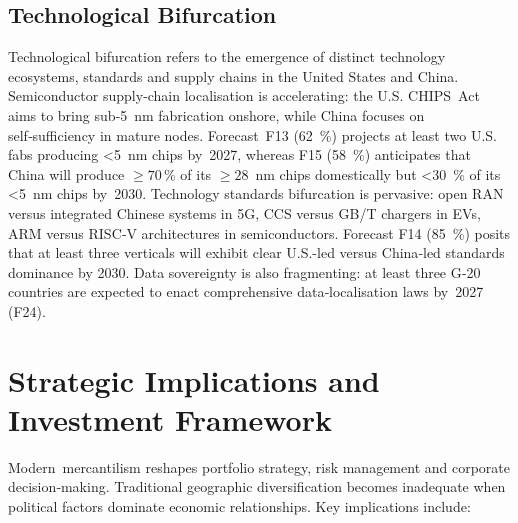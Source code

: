 \documentclass[12pt]{article}
\begin{document}
\subsection{Technological Bifurcation}

Technological bifurcation refers to the emergence of distinct technology ecosystems, standards and supply chains in the United States and China.  Semiconductor supply‑chain localisation is accelerating: the U.S. CHIPS Act aims to bring sub‑5 nm fabrication onshore, while China focuses on self‑sufficiency in mature nodes.  Forecast F13 (62 \%) projects at least two U.S. fabs producing <5 nm chips by 2027, whereas F15 (58 \%) anticipates that China will produce \(\geq 70\,\%\) of its \(\geq 28\) nm chips domestically but <30 \% of its <5 nm chips by 2030.  Technology standards bifurcation is pervasive: open RAN versus integrated Chinese systems in 5G, CCS versus GB/T chargers in EVs, ARM versus RISC‑V architectures in semiconductors.  Forecast F14 (85 \%) posits that at least three verticals will exhibit clear U.S.-led versus China‑led standards dominance by 2030.  Data sovereignty is also fragmenting: at least three G‑20 countries are expected to enact comprehensive data‑localisation laws by 2027 (F24).

\section{Strategic Implications and Investment Framework}

Modern mercantilism reshapes portfolio strategy, risk management and corporate decision‑making.  Traditional geographic diversification becomes inadequate when political factors dominate economic relationships.  Key implications include:
\end{document}
